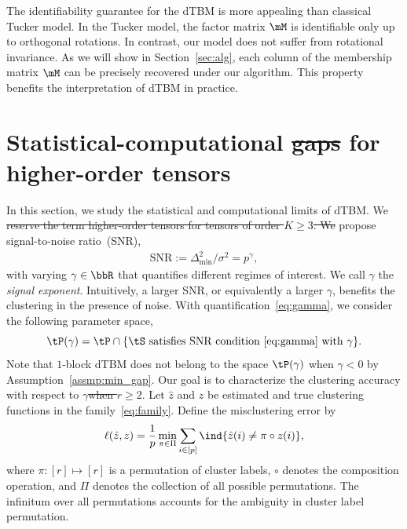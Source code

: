 \documentclass[lettersize,onecolumn,journal]{IEEEtran}
\theoremstyle{definition}
\theoremstyle{definition}
\providecommand{\DIFaddtex}[1]{{\protect\color{blue}\uwave{#1}}} %
\providecommand{\DIFdeltex}[1]{{\protect\color{red}\sout{#1}}}                      %
\providecommand{\DIFaddbegin}{} %
\providecommand{\DIFaddend}{} %
\providecommand{\DIFdelbegin}{} %
\providecommand{\DIFdelend}{} %
\providecommand{\DIFadd}[1]{\texorpdfstring{\DIFaddtex{#1}}{#1}} %
\providecommand{\DIFdel}[1]{\texorpdfstring{\DIFdeltex{#1}}{}} %
\newcommand{\DIFscaledelfig}{0.5}
\newlength{\DIFdelgraphicswidth} %
\newlength{\DIFdelgraphicsheight} %
\newcommand{\DIFaddincludegraphics}[2][]{{\color{blue}\fbox{\DIFOincludegraphics[#1]{#2}}}} %
\newcommand{\DIFdelincludegraphics}[2][]{%
\sbox{\DIFdelgraphicsbox}{\DIFOincludegraphics[#1]{#2}}%
\settoboxwidth{\DIFdelgraphicswidth}{\DIFdelgraphicsbox} %
\settoboxtotalheight{\DIFdelgraphicsheight}{\DIFdelgraphicsbox} %
\scalebox{\DIFscaledelfig}{%
\parbox[b]{\DIFdelgraphicswidth}{\usebox{\DIFdelgraphicsbox}\\[-\baselineskip] \rule{\DIFdelgraphicswidth}{0em}}\llap{\resizebox{\DIFdelgraphicswidth}{\DIFdelgraphicsheight}{%
\setlength{\unitlength}{\DIFdelgraphicswidth}%
\begin{picture}(1,1)%
\thicklines\linethickness{2pt} %
{\color[rgb]{1,0,0}\put(0,0){\framebox(1,1){}}}%
{\color[rgb]{1,0,0}\put(0,0){\line( 1,1){1}}}%
{\color[rgb]{1,0,0}\put(0,1){\line(1,-1){1}}}%
\end{picture}%
}\hspace*{3pt}}} %
} %
\DeclareRobustCommand{\DIFaddbegin}{\DIFOaddbegin \let\includegraphics\DIFaddincludegraphics} %
\DeclareRobustCommand{\DIFaddend}{\DIFOaddend \let\includegraphics\DIFOincludegraphics} %
\DeclareRobustCommand{\DIFdelbegin}{\DIFOdelbegin \let\includegraphics\DIFdelincludegraphics} %
\DeclareRobustCommand{\DIFdelend}{\DIFOaddend \let\includegraphics\DIFOincludegraphics} %
\begin{document}
The identifiability guarantee for the dTBM is more appealing than classical Tucker model. In the Tucker model, the factor matrix $\mM$ is identifiable only up to orthogonal rotations. In contrast, our model does not suffer from rotational invariance. As we will show in Section~\ref{sec:alg}, each column of the membership matrix $\mM$ can be precisely recovered under our algorithm. This property benefits the interpretation of dTBM in practice. 

\section{Statistical-computational \DIFdelbegin \DIFdel{gaps }\DIFdelend \DIFaddbegin \DIFadd{limits }\DIFaddend for higher-order tensors}\label{sec:limits}

In this section, we study the statistical and computational limits of dTBM. We \DIFdelbegin \DIFdel{reserve the term higher-order tensors for tensors of order $K\geq 3$. We }\DIFdelend propose signal-to-noise ratio~(SNR),
\begin{align}\label{eq:gamma}
  \text{SNR}:= \Delta^2_{\min}/\sigma^2 = p^{\gamma}, 
\end{align}
with varying $\gamma \in \bbR$ that quantifies different regimes of interest. We call $\gamma$ the \emph{signal exponent}. Intuitively, a larger SNR, or equivalently a larger $\gamma$, benefits the clustering in the presence of noise. With quantification~\eqref{eq:gamma}, we consider the following parameter space,
\begin{equation}\label{eq:gammafamily}
    \tP(\gamma) = \tP\cap\{\tS \text{ satisfies SNR condition~\eqref{eq:gamma} with $\gamma$} \}.
\end{equation}
Note that $1$-block dTBM does not belong to the space $\tP(\gamma)$ when $\gamma < 0$ by Assumption~\ref{assmp:min_gap}. Our goal is to characterize the clustering accuracy with respect to $\gamma$\DIFdelbegin \DIFdel{when $r \geq 2$}\DIFdelend . Let $\hat z$ and $z$ be \DIFaddbegin \DIFadd{the }\DIFaddend estimated and true clustering functions in the family~\eqref{eq:family}. Define the misclustering error by
\[
\ell(\hat z, z)={1\over p}\min_{\pi \in \Pi}\sum_{i\in[p]}\ind\{\hat z(i)\neq \pi \circ z(i)\},
\]
where $\pi: [r] \mapsto [r]$ is a permutation of cluster labels, $\circ$ denotes the composition operation, and $\Pi$ denotes the collection of all possible permutations. The infinitum over all permutations accounts for the ambiguity in cluster label permutation. 
\end{document}
